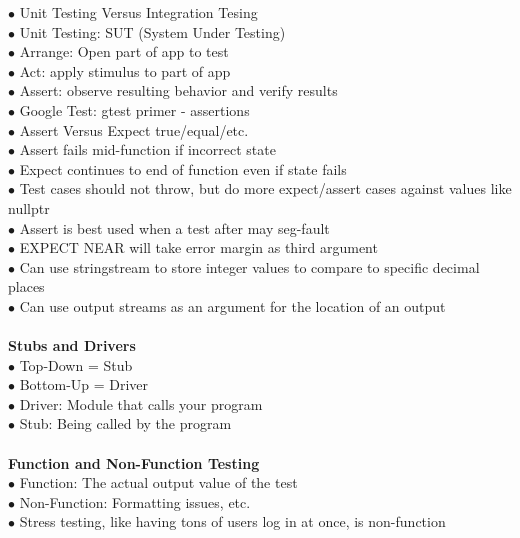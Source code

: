 \documentclass[11pt]{article}
\begin{document}
\indent $\bullet$ Unit Testing Versus Integration Tesing \\
\indent\indent $\bullet$ Unit Testing: SUT (System Under Testing)\\
\indent\indent\indent  $\bullet$ Arrange: Open part of app to test\\ 
\indent\indent\indent  $\bullet$ Act: apply stimulus to part of app \\
\indent\indent\indent  $\bullet$ Assert: observe resulting behavior and verify results  \\
\indent\indent $\bullet$ Google Test: gtest primer - assertions \\
\indent\indent $\bullet$ Assert Versus Expect true/equal/etc. \\
\indent\indent\indent $\bullet$ Assert fails mid-function if incorrect state \\
\indent\indent\indent $\bullet$ Expect continues to end of function even if state fails \\
\indent\indent $\bullet$ Test cases should not throw, but do more expect/assert cases against values like nullptr \\
\indent\indent $\bullet$ Assert is best used when a test after may seg-fault \\
\indent\indent $\bullet$ EXPECT NEAR will take error margin as third argument \\
\indent\indent $\bullet$ Can use stringstream to store integer values to compare to specific decimal places \\
\indent\indent\indent $\bullet$ Can use output streams as an argument for the location of an output \\
\\
\textbf{Stubs and Drivers}\\
\indent $\bullet$ Top-Down = Stub\\
\indent $\bullet$ Bottom-Up = Driver \\
\indent $\bullet$ Driver: Module that calls your program\\
\indent $\bullet$ Stub: Being called by the program\\
\\
\textbf{Function and Non-Function Testing}\\
\indent $\bullet$ Function: The actual output value of the test\\
\indent $\bullet$ Non-Function: Formatting issues, etc.\\
\indent $\bullet$ Stress testing, like having tons of users log in at once, is non-function\\
\end{document}
